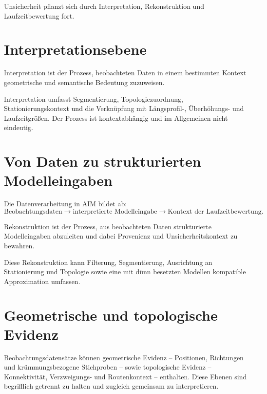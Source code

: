 Unsicherheit pflanzt sich durch Interpretation, Rekonstruktion und
Laufzeitbewertung fort.

\section{Interpretationsebene}

\begin{definition}[Interpretation]
Interpretation ist der Prozess, beobachteten Daten in einem bestimmten Kontext
geometrische und semantische Bedeutung zuzuweisen.
\end{definition}

Interpretation umfasst Segmentierung, Topologiezuordnung,
Stationierungskontext und die Verknüpfung mit Längsprofil-, Überhöhungs- und
Laufzeitgrößen. Der Prozess ist kontextabhängig und im Allgemeinen nicht
eindeutig.

\section{Von Daten zu strukturierten Modelleingaben}

Die Datenverarbeitung in AIM bildet ab:
\[
\text{Beobachtungsdaten}
\rightarrow
\text{interpretierte Modelleingabe}
\rightarrow
\text{Kontext der Laufzeitbewertung}.
\]

\begin{definition}
Rekonstruktion ist der Prozess, aus beobachteten Daten strukturierte
Modelleingaben abzuleiten und dabei Provenienz und Unsicherheitskontext zu
bewahren.
\end{definition}

Diese Rekonstruktion kann Filterung, Segmentierung, Ausrichtung an
Stationierung und Topologie sowie eine mit dünn besetzten Modellen kompatible
Approximation umfassen.

\section{Geometrische und topologische Evidenz}

Beobachtungsdatensätze können geometrische Evidenz -- Positionen, Richtungen
und krümmungsbezogene Stichproben -- sowie topologische Evidenz --
Konnektivität, Verzweigungs- und Routenkontext -- enthalten. Diese Ebenen sind
begrifflich getrennt zu halten und zugleich gemeinsam zu interpretieren.

